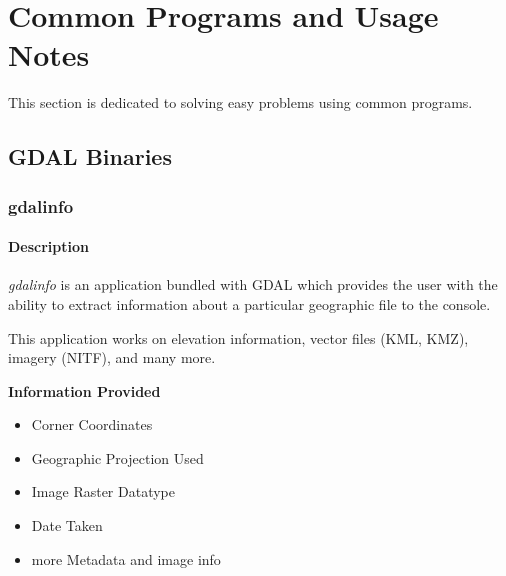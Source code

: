 \chapter*{Common Programs and Usage Notes}
This section is dedicated to solving easy problems using common programs.  

\section*{GDAL Binaries}

\subsection*{gdalinfo}

\subsubsection*{Description}
\emph{gdalinfo} is an application bundled with GDAL which provides the user with the ability to extract information about a 
particular geographic file to the console.   

This application works on elevation information, vector files (KML, KMZ), imagery (NITF), and many more. 

\textbf{ Information Provided}
\begin{itemize}
\item Corner Coordinates
\item Geographic Projection Used
\item Image Raster Datatype
\item Date Taken
\item more Metadata and image info
\end{itemize}

